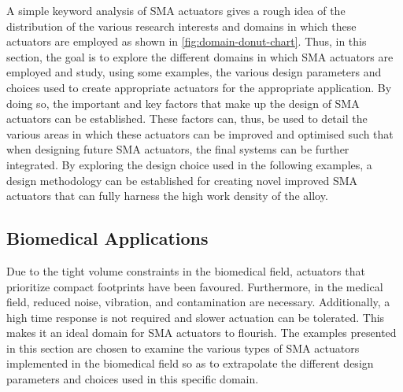 A simple keyword analysis of SMA actuators gives a rough idea of the distribution of the various research interests and domains in which these actuators are employed as shown in \cref{fig:domain-donut-chart}. Thus, in this section, the goal is to explore the different domains in which SMA actuators are employed and study, using some examples, the various design parameters and choices used to create appropriate actuators for the appropriate application. By doing so, the important and key factors that make up the design of SMA actuators can be established. These factors can, thus, be used to detail the various areas in which these actuators can be improved and optimised such that when designing future SMA actuators, the final systems can be further integrated. By exploring the design choice used in the following examples, a design methodology can be established for creating novel improved SMA actuators that can fully harness the high work density of the alloy.

\subsection{Biomedical Applications}
Due to the tight volume constraints in the biomedical field, actuators that prioritize compact footprints have been favoured. Furthermore, in the medical field, reduced noise, vibration, and contamination are necessary. Additionally, a high time response is not required and slower actuation can be tolerated. This makes it an ideal domain for SMA actuators to flourish. The examples presented in this section are chosen to examine the various types of SMA actuators implemented in the biomedical field so as to extrapolate the different design parameters and choices used in this specific domain.

